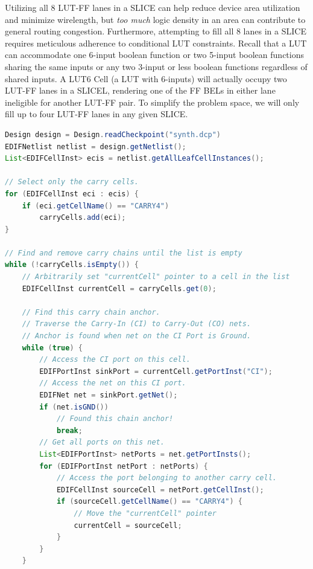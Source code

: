 \begin{multicols}{2}
Utilizing all 8 LUT-FF lanes in a SLICE can help reduce device area utilization and minimize wirelength, but \emph{too much} logic density in an area can contribute to general routing congestion. 
Furthermore, attempting to fill all 8 lanes in a SLICE requires meticulous adherence to conditional LUT constraints. 
Recall that a LUT can accommodate one 6-input boolean function or two 5-input boolean functions sharing the same inputs or any two 3-input or less boolean functions regardless of shared inputs. 
A LUT6 Cell (a LUT with 6-inputs) will actually occupy two LUT-FF lanes in a SLICEL, rendering one of the FF BELs in either lane ineligible for another LUT-FF pair. 
To simplify the problem space, we will only fill up to four LUT-FF lanes in any given SLICE. 


\begin{lstlisting}[language=java, caption={Netlist extraction and traversal}, label={lst:netlist_extract}]
Design design = Design.readCheckpoint("synth.dcp")
EDIFNetlist netlist = design.getNetlist();
List<EDIFCellInst> ecis = netlist.getAllLeafCellInstances();

// Select only the carry cells.
for (EDIFCellInst eci : ecis) {
    if (eci.getCellName() == "CARRY4")
        carryCells.add(eci);
}

// Find and remove carry chains until the list is empty
while (!carryCells.isEmpty()) {
    // Arbitrarily set "currentCell" pointer to a cell in the list
    EDIFCellInst currentCell = carryCells.get(0);

    // Find this carry chain anchor.
    // Traverse the Carry-In (CI) to Carry-Out (CO) nets.
    // Anchor is found when net on the CI Port is Ground.
    while (true) {
        // Access the CI port on this cell.
        EDIFPortInst sinkPort = currentCell.getPortInst("CI");
        // Access the net on this CI port.
        EDIFNet net = sinkPort.getNet();
        if (net.isGND())
            // Found this chain anchor!
            break;
        // Get all ports on this net.
        List<EDIFPortInst> netPorts = net.getPortInsts();
        for (EDIFPortInst netPort : netPorts) {
            // Access the port belonging to another carry cell.
            EDIFCellInst sourceCell = netPort.getCellInst();
            if (sourceCell.getCellName() == "CARRY4") {
                // Move the "currentCell" pointer
                currentCell = sourceCell;
            }
        }
    }


\end{lstlisting}
\end{multicols}

